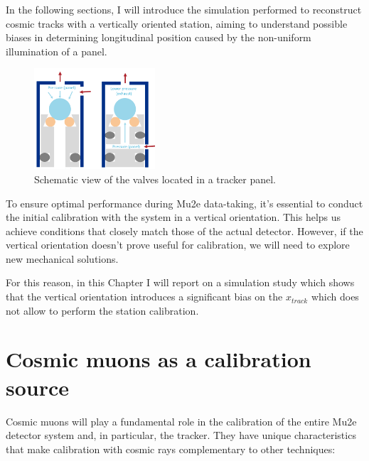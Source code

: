 In the following sections, I will 
introduce the simulation performed to 
reconstruct cosmic tracks with 
a vertically oriented station, aiming 
to understand possible biases in 
determining longitudinal position 
caused by the non-uniform illumination of a panel.

\begin{figure}[!h]
    \centering
    \includegraphics[width =0.4\textwidth]{figures/png/gassystem.png}
    \caption[Schematic view of the valves located in a tracker panel.]{Schematic view of the valves located in a tracker panel.}
    \label{fig:gassystem}
\end{figure}
To ensure optimal performance during Mu2e data-taking, it's essential to 
conduct the initial calibration with the system in a vertical orientation. 
This helps us achieve conditions that closely 
match those of the actual detector. However, if the vertical 
orientation doesn't prove useful for calibration, 
we will need to explore new mechanical solutions.

For this reason, in this Chapter I will report on a simulation study 
which shows that the vertical orientation introduces a significant bias on 
the $x_{track}$ which does not allow to perform the station 
calibration. 



\section{Cosmic muons as a calibration source}
Cosmic muons will play a fundamental role in the 
calibration of the entire Mu2e detector system and, 
in particular, the tracker. They have unique 
characteristics that make calibration with cosmic rays 
complementary to other techniques:

 


